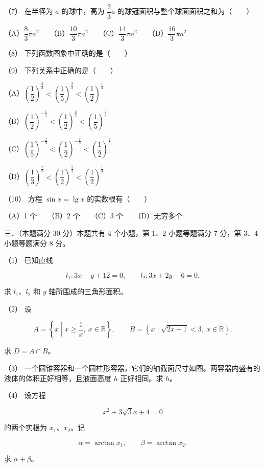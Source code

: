 \begin{question}
（7） 在半径为 $a$ 的球中，高为 $\dfrac23a$ 的球冠面积与整个球面面积之和为\mbox{（　　）}

（A）$\dfrac83\pi a^2$　　（B）$\dfrac{10}3\pi a^2$　　（C）$\dfrac{14}3\pi a^2$　　（D）$\dfrac{16}3\pi a^2$

（8） 下列函数图象中正确的是\mbox{（　　）}
\nopagebreak[4]
\begin{center}\end{center}
\nopagebreak[4]
（9） 下列关系中正确的是\mbox{（　　）}

（A）$\left(\dfrac12\right)^{\frac23}<\left(\dfrac15\right)^{\frac23}<\left(\dfrac12\right)^{\frac13}$

（B）$\left(\dfrac12\right)^{-\frac13}<\left(\dfrac12\right)^{\frac23}<\left(\dfrac15\right)^{\frac23}$

（C）$\left(\dfrac15\right)^{-\frac23}<\left(\dfrac12\right)^{-\frac13}<\left(\dfrac12\right)^{\frac23}$

（D）$\left(\dfrac13\right)^{\frac23}<\left(\dfrac12\right)^{\frac23}<\left(\dfrac12\right)^{\frac13}$

（10） 方程 $\sin x=\lg x$ 的实数根有\mbox{（　　）}

（A）1 个　　（B）2 个　　（C）3 个　　（D）无穷多个

\Needspace{0.4\textheight}
\end{question}
\begin{question}

三、（本题满分 30 分）本题共有 4 个小题，第 1、2 小题等题满分 7 分，第 3、4 小题等题满分 8 分。

（1） 已知直线

\nopagebreak[4]
\[
l_1:3x-y+12=0,\qquad l_2:3x+2y-6=0.
\]

求 $l_1$、$l_2$ 和 $y$ 轴所围成的三角形面积。

（2） 设

\nopagebreak[4]
\[
A=\left\{x\mathrel{}\middle|\mathrel{}x\ge\frac1x,\ x\in\mathbb R\right\},
\qquad
B=\left\{x\mathrel{}\middle|\mathrel{}\sqrt{2x+1}<3,\ x\in\mathbb R\right\}.
\]

求 $D=A\cap B$。

（3） 一个圆锥容器和一个圆柱形容器，它们的轴截面尺寸如图。两容器内盛有的液体的体积正好相等，且液面高度 $h$ 正好相同。求 $h$。
\nopagebreak[4]
\begin{center}\end{center}
\nopagebreak[4]
（4） 设方程

\nopagebreak[4]
\[
x^2+3\sqrt3x+4=0
\]

的两个实根为 $x_1\text{、}x_2$。记

\nopagebreak[4]
\[
\alpha=\arctan x_1,\qquad \beta=\arctan x_2.
\]

求 $\alpha+\beta$。

\end{question}
